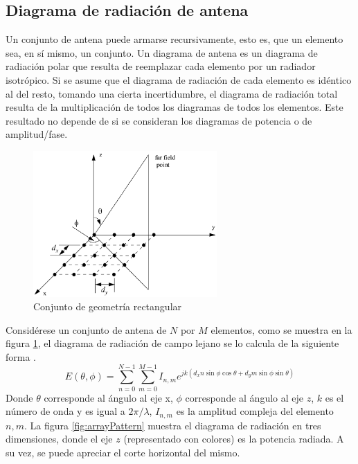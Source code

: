 \subsection{Diagrama de radiación de antena}

Un conjunto de antena puede armarse recursivamente, esto es, que un elemento sea, en sí mismo, un conjunto. Un diagrama de antena es
un diagrama de radiación polar que resulta de reemplazar cada elemento por un radiador isotrópico. Si se asume que el diagrama de
radiación de cada elemento es idéntico al del resto, tomando una cierta incertidumbre, el diagrama de radiación total resulta de
la multiplicación de todos los diagramas de todos los elementos. Este resultado no depende de si se consideran los diagramas de
potencia o de amplitud/fase. 

\begin{figure}[H]
 \centering
 \includegraphics[width=7cm]{gfx/rectangularArrayGeometry.png}
 \caption{Conjunto de geometría rectangular \cite{Mahafza2004}}
 \label{fig:arrayGeometry}
\end{figure}

Considérese un conjunto de antena de $N$ por $M$ elementos, como se muestra en la figura \ref{fig:arrayGeometry}, el diagrama de
radiación de campo lejano se lo calcula de la siguiente forma \cite{Mahafza2004}.
\begin{equation}
	E(\theta, \phi) = \sum_{n=0}^{N-1}\sum_{m=0}^{M-1} I_{n,m} e^{jk(d_xn\sin\phi\cos\theta + d_ym\sin\phi\sin\theta)}
\end{equation}
Donde $\theta$ corresponde al ángulo al eje x, $\phi$ corresponde al ángulo al eje $z$, $k$ es el número de onda y es igual
a $2\pi/\lambda$, $I_{n,m}$ es la amplitud compleja del elemento $n,m$. La figura \ref{fig:arrayPattern} muestra el diagrama de
radiación en tres dimensiones, donde el eje $z$ (representado con colores) es la potencia radiada. A su vez, se puede apreciar 
el corte horizontal del mismo.

